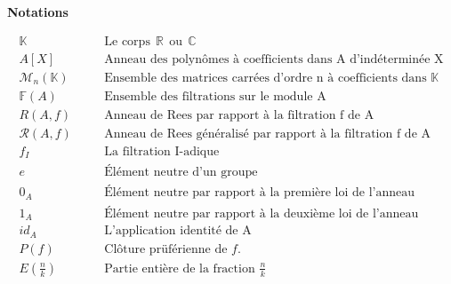 \newpage

\begin{center}
	\LARGE{\textbf{Notations}}
\end{center}


\begin{eqnarray*}
	\mathbb{K} & & \quad \text{Le  corps} \ \ \mathbb{R} \ \ \text{ou} \ \ \mathbb{C}\\
	A[X] & & \quad \text{Anneau des polynômes à coefficients dans A d'indéterminée X}\\
	\mathcal{M}_n(\mathbb{K}) & & \quad \text{Ensemble des matrices carrées d'ordre n à coefficients dans $\mathbb{K}$}\\
	\mathbb{F}(A) & & \quad \text{Ensemble des filtrations sur le module A}\\
	R(A,f) & & \quad \text{Anneau de Rees par rapport à la filtration f de A}\\
	\mathcal{R}(A,f) & & \quad \text{Anneau de Rees généralisé par rapport à la filtration f de A}\\
	f_{I} & & \quad \text{La filtration I-adique} \\
	e & & \quad \text{Élément neutre d'un groupe} \\
	0_{A} & & \quad \text{Élément neutre par rapport à la première loi de l'anneau} \\
	1_{A} & & \quad \text{Élément neutre par rapport à la deuxième loi de l'anneau} \\
	id_{A} & & \quad \text{L'application identité de A} \\
	P(f) & & \quad \text{Clôture prüférienne de $f$.} \\
	E(\frac{n}{k}) & & \quad \text{Partie entière de la fraction $\frac{n}{k}$ } \\
\end{eqnarray*}